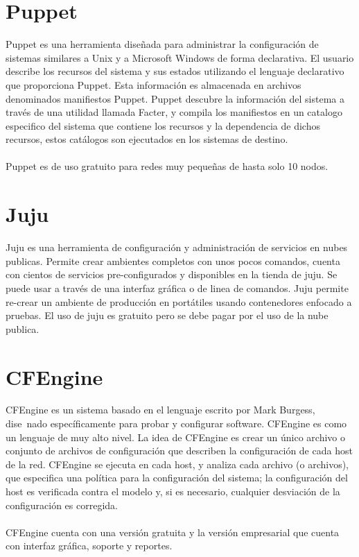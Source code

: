 \section{Puppet}
Puppet es una herramienta diseñada para administrar la configuración de sistemas similares a Unix y a Microsoft Windows de forma declarativa. El usuario describe los recursos del sistema y sus estados utilizando el lenguaje declarativo que proporciona Puppet. Esta información es almacenada en archivos denominados manifiestos Puppet. Puppet descubre la información del sistema a través de una utilidad llamada Facter, y compila los manifiestos en un catalogo especifico del sistema que contiene los recursos y la dependencia de dichos recursos, estos catálogos son ejecutados en los sistemas de destino. \cite{Pupet15}\\
\\
Puppet es de uso gratuito para redes muy pequeñas de hasta solo 10 nodos.

\section{Juju}
Juju \cite{juju16} es una herramienta de configuración y administración de servicios en nubes publicas. Permite crear ambientes completos con unos pocos comandos, cuenta con cientos de servicios pre-configurados y disponibles en la tienda de juju. Se puede usar a través de una interfaz gráfica o de linea de comandos. Juju permite re-crear un ambiente de producción en portátiles usando contenedores enfocado a pruebas. El uso de juju es gratuito pero se debe pagar por el uso de la nube publica.

\section{CFEngine}
CFEngine es un sistema basado en el lenguaje escrito por Mark Burgess, dise~nado específicamente para probar y configurar software. CFEngine es como un lenguaje de muy alto nivel. La idea de CFEngine es crear un único archivo o conjunto de archivos de configuración que describen la configuración de cada host de la red. CFEngine se ejecuta en cada host, y analiza cada archivo (o archivos), que especifica una política para la configuración del sistema; la configuración del host es verificada contra el modelo y, si es necesario, cualquier desviación de la configuración es corregida. \cite{cfengine15}\\
\\
CFEngine cuenta con una versión gratuita y la versión empresarial que cuenta con interfaz gráfica, soporte y reportes.


